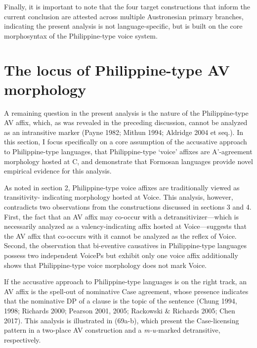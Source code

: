 \documentclass[10pt]{article}
\begin{document}
Finally, it is important to note that the four target constructions that inform the current conclusion are attested across multiple Austronesian primary branches, indicating the present analysis is not language-specific, but is built on the core morphosyntax of the Philippine-type voice system. 




\section{The locus of Philippine-type AV morphology}

\noindent A remaining question in the present analysis is the nature of the Philippine-type AV affix, which, as was revealed in the preceding discussion, cannot be analyzed as an intransitive marker (Payne 1982; Mithun 1994; Aldridge 2004 et seq.). In this section, I focus specifically on a core assumption of the accusative approach to Philippine-type languages, that Philippine-type `voice' affixes are A'-agreement morphology hosted at C, and demonstrate that Formosan languages provide novel empirical evidence for this analysis.

As noted in section 2, Philippine-type voice affixes are traditionally viewed as transitivity- indicating morphology hosted at Voice. This analysis, however, contradicts two observations from the constructions discussed in sections 3 and 4. First, the fact that an AV affix may co-occur with a detransitivizer---which is necessarily analyzed as a valency-indicating affix hosted at Voice---suggests that the AV affix that co-occurs with it cannot be analyzed as the reflex of Voice. Second, the observation that bi-eventive causatives in Philippine-type languages possess two independent VoicePs but exhibit only one voice affix additionally shows that Philippine-type voice morphology does not mark Voice.


 
If the accusative approach to Philippine-type languages is on the right track, an AV affix is the spell-out of nominative Case agreement, whose presence indicates that the nominative DP of a clause is the topic of the sentence (Chung 1994, 1998; Richards 2000; Pearson 2001, 2005; Rackowski \& Richards 2005; Chen 2017). This analysis is illustrated in (69a-b), which present the Case-licensing pattern in a two-place AV construction and a \textit{m-u-}marked detransitive, respectively. 

\newpage
\end{document}

